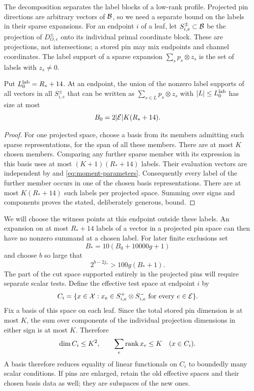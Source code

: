 The decomposition separates the label blocks of a low-rank profile.
Projected pin directions are arbitrary vectors of $\mathcal B$, so we need
a separate bound on the labels in their sparse expansions.
For an endpoint $i$ of a leaf, let $S_{i,e}^{\pm}\subset\mathcal B$
be the projection of $D_{O,e}^{\pm}$ onto its individual primal
coordinate block.  These are projections, not intersections;
a stored pin may mix endpoints and channel coordinates.
The label support of a sparse expansion
$\sum_s p_s\otimes z_s$ is the set of labels with $z_s\ne0$.

\begin{lemma}\label{lem:sparse-pin-labels}
Put $L_0^{\rm lab}=R_*+14$.  At an endpoint, the union of the
nonzero label supports of all vectors in all $S_{i,e}^{\pm}$
that can be written as
$\sum_{s\in L}p_s\otimes z_s$ with $|L|\le L_0^{\rm lab}$
has size at most
\begin{equation}\label{eq:label-budget}
 B_0=2|\mathcal E|K(R_*+14).
\end{equation}
\end{lemma}
\begin{proof}
For one projected space, choose a basis from its members admitting
such sparse representations, for the span of all these members.
There are at most $K$ chosen members.  Comparing any further sparse
member with its expression in this basis uses at most
$(K+1)(R_*+14)$ labels.  Their evaluation vectors are independent
by  and \eqref{eq:moment-parameters}.
Consequently every label of the further member occurs in one of
the chosen basis representations.  There are at most
$K(R_*+14)$ such labels per projected space.  Summing over signs
and components proves the stated, deliberately generous, bound.
\end{proof}

We will choose the witness points at this endpoint outside these
labels.  An expansion on at most $R_*+14$ labels of a vector in a
projected pin space can then have no nonzero summand at a chosen label.
For later finite exclusions set
\[
 B_*=10(B_0+10000g+1)
\]
and choose $b$ so large that
\begin{equation}\label{eq:selector-size}
 2^{b-2j_*}>100g(B_*+1).
\end{equation}
The part of the cut space supported entirely in the projected pins
will require separate scalar tests.  Define the effective test space
at endpoint $i$ by
\begin{equation}\label{eq:effective-space}
 C_i=\{x\in\mathcal X:x_e\in S_{i,e}^+\otimes S_{i,e}^-
                  \text{ for every }e\in\mathcal E\}.
\end{equation}
Fix a basis of this space on each leaf.  Since the total stored
pin dimension is at most $K$, the sum over components of the
individual projection dimensions in either sign is at most $K$.
Therefore
\begin{equation}\label{eq:effective-bounds}
 \dim C_i\le K^2,\qquad
 \sum_e\operatorname{rank} x_e\le K\quad(x\in C_i).
\end{equation}
A basis therefore reduces equality of linear functionals on $C_i$
to boundedly many scalar conditions.
If pins are enlarged, retain the old effective spaces and their
chosen basis data as well; they are subspaces of the new ones.

